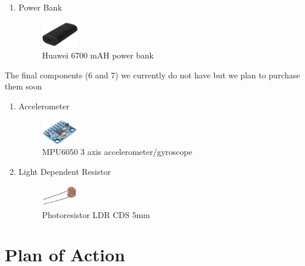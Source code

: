 \documentclass[conference]{IEEEtran}
\begin{document}
\begin{enumerate}
        \item Power Bank
        \begin{figure}[H]
        \centering
        \captionsetup{justification=centering}
        \centering
            \includegraphics[width=0.15\textwidth]{pb.png}
            \caption{Huawei 6700 mAH power bank \cite{pb}}
        \end{figure}

    \end{enumerate}

    The final components (6 and 7) we currently do not have but we plan to purchase them soon\\

    \begin{enumerate}[resume]

        \item Accelerometer
        \begin{figure}[H]
        \centering
        \captionsetup{justification=centering}
        \centering
            \includegraphics[width=0.15\textwidth]{g.png}
            \caption{MPU6050 3 axis accelerometer/gyroscope \cite{g}}
        \end{figure}

        \item Light Dependent Resistor
        \begin{figure}[H]
        \centering
        \captionsetup{justification=centering}
        \centering
            \includegraphics[width=0.15\textwidth]{ldr.png}
            \caption{Photoresistor LDR CDS 5mm \cite{LDR}}
        \end{figure}

    \end{enumerate}
    
    \section{Plan of Action}
\end{document}
